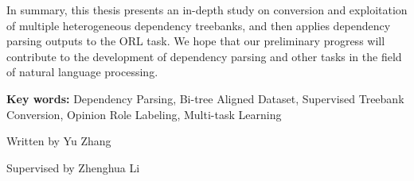 \begin{eabstract}
\begin{enumerate}
	\end{enumerate}

	In summary, this thesis presents an in-depth study on conversion and exploitation of multiple heterogeneous dependency treebanks, and then applies dependency parsing outputs to the ORL task.
	We hope that our preliminary progress will contribute to the development of dependency parsing and other tasks in the field of natural language processing.


	\vskip 21bp
		{\bf{} Key words: }
	Dependency Parsing,
	Bi-tree Aligned Dataset,
	Supervised Treebank Conversion,
	Opinion Role Labeling,
	Multi-task Learning
\end{eabstract}

\begin{flushright}
	Written by Yu Zhang

	Supervised by Zhenghua Li
\end{flushright}
